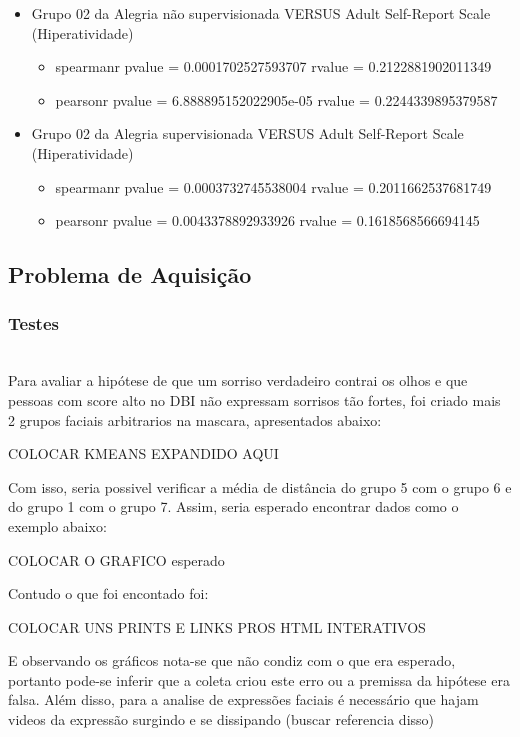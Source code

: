 \begin{itemize}
    \item Grupo 02 da Alegria não supervisionada VERSUS Adult Self-Report Scale (Hiperatividade)
    \begin{itemize}
        \item spearmanr
            \subitem pvalue = 0.0001702527593707
            \subitem rvalue = 0.2122881902011349
        \item pearsonr
            \subitem pvalue = 6.888895152022905e-05
            \subitem rvalue = 0.2244339895379587
    \end{itemize}
\item Grupo 02 da Alegria supervisionada VERSUS Adult Self-Report Scale (Hiperatividade)
    \begin{itemize}
        \item spearmanr
            \subitem pvalue = 0.0003732745538004
            \subitem rvalue = 0.2011662537681749
        \item pearsonr
            \subitem pvalue = 0.0043378892933926
            \subitem rvalue = 0.1618568566694145
    \end{itemize}
\end{itemize}


\subsection{Problema de Aquisição}

\subsubsection{Testes}\mbox{}\\

Para avaliar a hipótese de que um sorriso verdadeiro contrai os olhos e que pessoas com score alto no DBI não expressam sorrisos tão fortes, foi criado mais 2 grupos faciais arbitrarios na mascara, apresentados abaixo:

COLOCAR KMEANS EXPANDIDO AQUI

Com isso, seria possivel verificar a média de distância do grupo 5 com o grupo 6 e do grupo 1 com o grupo 7. Assim, seria esperado encontrar dados como o exemplo abaixo:

COLOCAR O GRAFICO esperado

Contudo o que foi encontado foi:

COLOCAR UNS PRINTS E LINKS PROS HTML INTERATIVOS

E observando os gráficos nota-se que não condiz com o que era esperado, portanto pode-se inferir que a coleta criou este erro ou a premissa da hipótese era falsa.
Além disso, para a analise de expressões faciais é necessário que hajam videos da expressão surgindo e se dissipando (buscar referencia disso)